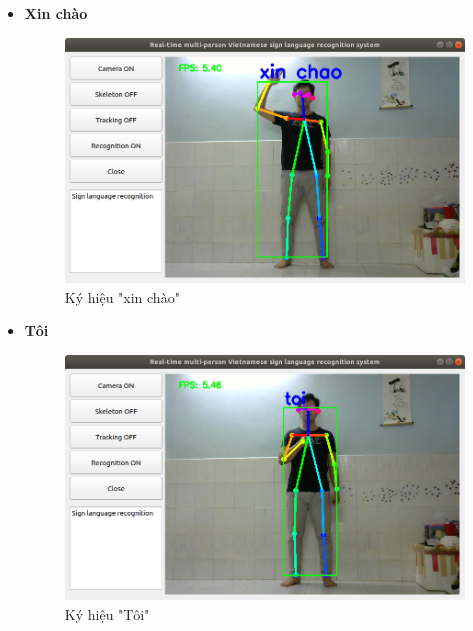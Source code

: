 \documentclass[12pt,a4paper,oneside]{book}
\numberwithin{equation}{chapter} %
\numberwithin{figure}{chapter} %
\numberwithin{table}{chapter} %
\begin{document}
\begin{itemize}

\item \textbf{Xin chào}
\FloatBarrier
\begin{figure}[htp]
\begin{center}
\includegraphics[scale=0.4]{kq/xin_chao.png}
\end{center}
\caption{Ký hiệu "xin chào"}
\end{figure}
\FloatBarrier
\pagebreak

\item \textbf{Tôi}
\FloatBarrier
\begin{figure}[htp]
\begin{center}
\includegraphics[scale=0.4]{kq/toi.png}
\end{center}
\caption{Ký hiệu "Tôi"}
\end{figure}
\FloatBarrier


\end{itemize}
\end{document}
